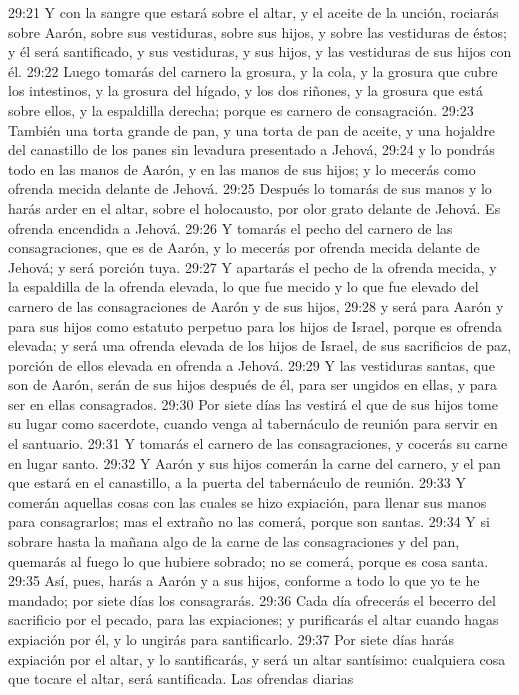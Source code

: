29:21 Y con la sangre que estará sobre el altar, y el aceite de la unción, rociarás sobre Aarón, sobre sus vestiduras, sobre sus hijos, y sobre las vestiduras de éstos; y él será santificado, y sus vestiduras, y sus hijos, y las vestiduras de sus hijos con él. 
29:22 Luego tomarás del carnero la grosura, y la cola, y la grosura que cubre los intestinos, y la grosura del hígado, y los dos riñones, y la grosura que está sobre ellos, y la espaldilla derecha; porque es carnero de consagración. 
29:23 También una torta grande de pan, y una torta de pan de aceite, y una hojaldre del canastillo de los panes sin levadura presentado a Jehová, 
29:24 y lo pondrás todo en las manos de Aarón, y en las manos de sus hijos; y lo mecerás como ofrenda mecida delante de Jehová. 
29:25 Después lo tomarás de sus manos y lo harás arder en el altar, sobre el holocausto, por olor grato delante de Jehová. Es ofrenda encendida a Jehová. 
29:26 Y tomarás el pecho del carnero de las consagraciones, que es de Aarón, y lo mecerás por ofrenda mecida delante de Jehová; y será porción tuya. 
29:27 Y apartarás el pecho de la ofrenda mecida, y la espaldilla de la ofrenda elevada, lo que fue mecido y lo que fue elevado del carnero de las consagraciones de Aarón y de sus hijos, 
29:28 y será para Aarón y para sus hijos como estatuto perpetuo para los hijos de Israel, porque es ofrenda elevada; y será una ofrenda elevada de los hijos de Israel, de sus sacrificios de paz, porción de ellos elevada en ofrenda a Jehová. 
29:29 Y las vestiduras santas, que son de Aarón, serán de sus hijos después de él, para ser ungidos en ellas, y para ser en ellas consagrados. 
29:30 Por siete días las vestirá el que de sus hijos tome su lugar como sacerdote, cuando venga al tabernáculo de reunión para servir en el santuario. 
29:31 Y tomarás el carnero de las consagraciones, y cocerás su carne en lugar santo. 
29:32 Y Aarón y sus hijos comerán la carne del carnero, y el pan que estará en el canastillo, a la puerta del tabernáculo de reunión. 
29:33 Y comerán aquellas cosas con las cuales se hizo expiación, para llenar sus manos para consagrarlos; mas el extraño no las comerá, porque son santas. 
29:34 Y si sobrare hasta la mañana algo de la carne de las consagraciones y del pan, quemarás al fuego lo que hubiere sobrado; no se comerá, porque es cosa santa. 
29:35 Así, pues, harás a Aarón y a sus hijos, conforme a todo lo que yo te he mandado; por siete días los consagrarás. 
29:36 Cada día ofrecerás el becerro del sacrificio por el pecado, para las expiaciones; y purificarás el altar cuando hagas expiación por él, y lo ungirás para santificarlo. 
29:37 Por siete días harás expiación por el altar, y lo santificarás, y será un altar santísimo: cualquiera cosa que tocare el altar, será santificada. 
Las ofrendas diarias 

